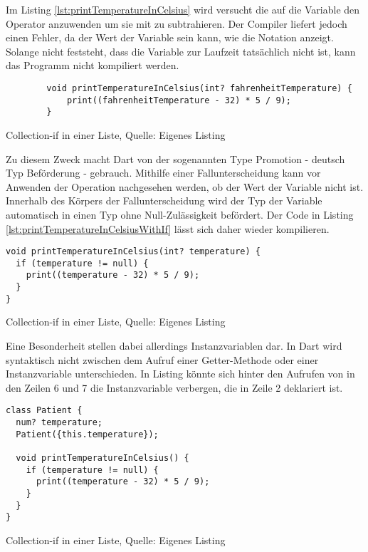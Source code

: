 Im Listing \ref{lst:printTemperatureInCelsius}
wird versucht die  auf die Variable  den Operator \IC{-} anzuwenden um sie mit  zu subtrahieren. Der Compiler liefert jedoch einen Fehler, da der Wert der Variable  sein kann, wie die Notation  anzeigt. Solange nicht feststeht, dass die Variable zur Laufzeit tatsächlich nicht  ist, kann das Programm nicht kompiliert werden.

\ifincludeall
  \begin{listing}[ht]
    \begin{verbatim}
        void printTemperatureInCelsius(int? fahrenheitTemperature) {
            print((fahrenheitTemperature - 32) * 5 / 9);
        }
\end{verbatim}
    \caption[Collection-if in einer Liste]{Collection-if in einer Liste, Quelle: Eigenes Listing}
    \label{lst:printTemperatureInCelsius}
  \end{listing}
\fi

Zu diesem Zweck macht Dart von der sogenannten Type Promotion - deutsch Typ Beförderung - gebrauch. Mithilfe einer Fallunterscheidung kann vor Anwenden der Operation nachgesehen werden, ob der Wert der Variable nicht  ist. Innerhalb des Körpers der Fallunterscheidung wird der Typ der Variable automatisch in einen Typ ohne Null-Zulässigkeit befördert. Der Code in Listing \ref{lst:printTemperatureInCelsiusWithIf} lässt sich daher wieder kompilieren.

\ifincludeall
  \begin{listing}[ht]
    \begin{verbatim}
void printTemperatureInCelsius(int? temperature) {
  if (temperature != null) {
    print((temperature - 32) * 5 / 9);
  }
}
\end{verbatim}
    \caption[Collection-if in einer Liste]{Collection-if in einer Liste, Quelle: Eigenes Listing}
    \label{lst:printTemperatureInCelsiusWithIf}
  \end{listing}
\fi

Eine Besonderheit stellen dabei allerdings Instanzvariablen dar. In Dart wird syntaktisch nicht zwischen dem Aufruf einer Getter-Methode oder einer Instanzvariable unterschieden. In Listing \label{lst:Patient}
könnte sich hinter den Aufrufen von  in den Zeilen 6 und 7 die Instanzvariable verbergen, die in Zeile 2 deklariert ist.

\ifincludeall
  \begin{listing}[ht]
    \begin{verbatim}
class Patient {
  num? temperature;
  Patient({this.temperature});

  void printTemperatureInCelsius() {
    if (temperature != null) {
      print((temperature - 32) * 5 / 9);
    }
  }
}
    \end{verbatim}
    \caption[Collection-if in einer Liste]{Collection-if in einer Liste, Quelle: Eigenes Listing}
    \label{lst:PatientWithoutNullCheck}
  \end{listing}
\fi

